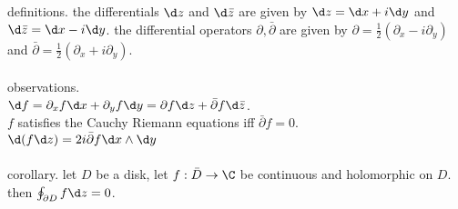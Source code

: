 definitions. 
the differentials $\d z$ and $\d\bar z$ are given by $\d z = \d x+i\d y$ and $\d \bar z=\d x - i \d y$. 
the differential operators $\partial,\bar\partial$ are given by $\partial = \frac{1}{2}(\partial_x - i\partial_y)$ and $\bar\partial=\frac{1}{2}(\partial_x + i\partial_y)$.
\\
\\
observations. \\
$\d f=\partial_x f \d x+\partial_y f \d y = \partial f \d z + \bar\partial f \d\bar z$. \\
$f$ satisfies the Cauchy Riemann equations iff $\bar\partial f= 0$. \\
$\d (f \d z)=2i\bar\partial f \d x\wedge\d y$
\\
\\
corollary. let $D$ be a disk, let $f:\bar D\to \C$ be continuous and holomorphic on $D$. then $\oint_{\partial D} f\d z = 0$.
